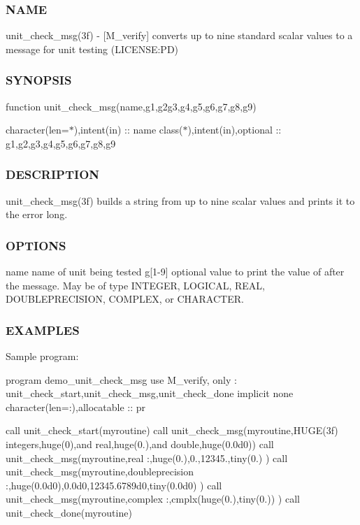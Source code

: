 \subsubsection*{N\+A\+ME}

unit\+\_\+check\+\_\+msg(3f) -\/ \mbox{[}M\+\_\+verify\mbox{]} converts up to nine standard scalar values to a message for unit testing (L\+I\+C\+E\+N\+SE\+:PD) \subsubsection*{S\+Y\+N\+O\+P\+S\+IS}

function unit\+\_\+check\+\_\+msg(name,g1,g2g3,g4,g5,g6,g7,g8,g9)

character(len=$\ast$),intent(in) \+:\+: name class($\ast$),intent(in),optional \+:\+: g1,g2,g3,g4,g5,g6,g7,g8,g9 \subsubsection*{D\+E\+S\+C\+R\+I\+P\+T\+I\+ON}

unit\+\_\+check\+\_\+msg(3f) builds a string from up to nine scalar values and prints it to the error long.

\subsubsection*{O\+P\+T\+I\+O\+NS}

name name of unit being tested g\mbox{[}1-\/9\mbox{]} optional value to print the value of after the message. May be of type I\+N\+T\+E\+G\+ER, L\+O\+G\+I\+C\+AL, R\+E\+AL, D\+O\+U\+B\+L\+E\+P\+R\+E\+C\+I\+S\+I\+ON, C\+O\+M\+P\+L\+EX, or C\+H\+A\+R\+A\+C\+T\+ER.

\subsubsection*{E\+X\+A\+M\+P\+L\+ES}

Sample program\+:

program demo\+\_\+unit\+\_\+check\+\_\+msg use M\+\_\+verify, only \+: unit\+\_\+check\+\_\+start,unit\+\_\+check\+\_\+msg,unit\+\_\+check\+\_\+done implicit none character(len=\+:),allocatable \+:\+: pr

call unit\+\_\+check\+\_\+start(\textquotesingle{}myroutine\textquotesingle{}) call unit\+\_\+check\+\_\+msg(\textquotesingle{}myroutine\textquotesingle{},\textquotesingle{}H\+U\+G\+E(3f) integers\textquotesingle{},huge(0),\textquotesingle{}and real\textquotesingle{},huge(0.),\textquotesingle{}and double\textquotesingle{},huge(0.\+0d0)) call unit\+\_\+check\+\_\+msg(\textquotesingle{}myroutine\textquotesingle{},\textquotesingle{}real \+:\textquotesingle{},huge(0.),0.,12345.,tiny(0.) ) call unit\+\_\+check\+\_\+msg(\textquotesingle{}myroutine\textquotesingle{},\textquotesingle{}doubleprecision \+:\textquotesingle{},huge(0.\+0d0),0.\+0d0,12345.\+6789d0,tiny(0.\+0d0) ) call unit\+\_\+check\+\_\+msg(\textquotesingle{}myroutine\textquotesingle{},\textquotesingle{}complex \+:\textquotesingle{},cmplx(huge(0.),tiny(0.)) ) call unit\+\_\+check\+\_\+done(\textquotesingle{}myroutine\textquotesingle{})


